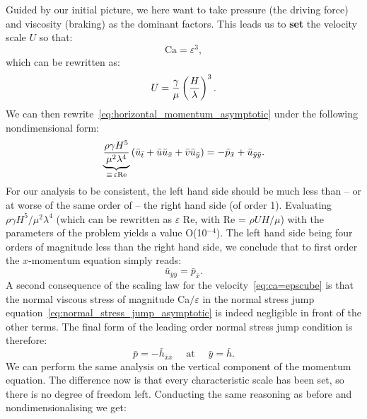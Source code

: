 Guided by our initial picture, we here want to take pressure (the driving force) and viscosity (braking) as the dominant factors. This leads us to \textbf{set} the velocity scale $U$ so that:
\begin{equation}
\text{Ca} = \varepsilon^3,
\label{eq:ca=epscube}
\end{equation}
which can be rewritten as:
\begin{equation}
U = \frac{\gamma}{\mu}\left(\frac{H}{\lambda}\right)^3.
\end{equation}
We can then rewrite~\eqref{eq:horizontal_momentum_asymptotic} under the following nondimensional form:
\begin{equation}
\underbrace{\frac{\rho \gamma H^5}{\mu^2 \lambda^4}}_{\equiv\,\varepsilon\text{Re}}\left(\bar u_{\bar t} + \bar u \bar u_{\bar x} + \bar v \bar u_{\bar y}\right) = -\bar p_{\bar x} + \bar u_{\bar y \bar y}.
\label{eq:horizontal_momentum_asymptotic_nondimensional}
\end{equation}
For our analysis to be consistent, the left hand side should be much less than -- or at worse of the same order of -- the right hand side (of order 1). Evaluating\, ${\rho \gamma H^5}/{\mu^2 \lambda^4}$ (which can be rewritten as $\varepsilon$ Re, with Re = $\rho U H/\mu$) with the parameters of the problem yields a value O(10$^{-4}$). The left hand side being four orders of magnitude less than the right hand side, we conclude that to first order the $x$-momentum equation simply reads:
\begin{equation}
\bar u_{\bar y \bar y} = \bar p_{\bar x}.
\label{eq:horizontal_momentum_asymptotic_nondimensional_leading_order}
\end{equation}
A second consequence of the scaling law for the velocity~\eqref{eq:ca=epscube} is that the normal viscous stress of magnitude Ca$/\varepsilon$ in the normal stress jump equation~\eqref{eq:normal_stress_jump_asymptotic} is indeed negligible in front of the other terms. The final form of the leading order normal stress jump condition is therefore:
\begin{equation}
\bar p = -\bar h_{\bar x \bar x}\quad \text{ at } \quad \bar y = \bar h.
\label{eq:interface_pressure_lubrication}
\end{equation}
 We can perform the same analysis on the vertical component of the momentum equation. The difference now is that every characteristic scale has been set, so there is no degree of freedom left. Conducting the same reasoning as before and nondimensionalising we get:
